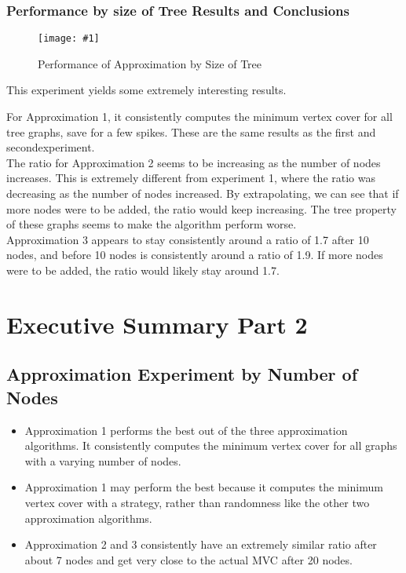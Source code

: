 \documentclass[12pt]{article}
\newcommand{\firgureBuffered}[2]
{
    \begin{figure}[ht!]
        \centering
        \texttt{[image: \#1]}
        \caption{#2}
    \end{figure}
}
\begin{document}
\subsubsection{Performance by size of Tree Results and Conclusions}

\FloatBarrier{}
\firgureBuffered{images/approxexperiments/Tree1.png}{Performance of Approximation by Size of Tree}
\FloatBarrier{}

This experiment yields some extremely interesting results.

For Approximation 1, it consistently computes the minimum vertex cover for all tree graphs, save for a few spikes. These are the same results as the first and secondexperiment. \\

The ratio for Approximation 2 seems to be increasing as the number of nodes increases. This is extremely different from experiment 1, where the ratio was decreasing as the number of nodes increased. By extrapolating, we can see that if more nodes were to be added, the ratio would keep increasing. The tree property of these graphs seems to make the algorithm perform worse.\\

Approximation 3 appears to stay consistently around a ratio of 1.7 after 10 nodes, and before 10 nodes is consistently around a ratio of 1.9. If more nodes were to be added, the ratio would likely stay around 1.7. \\



%
%
%
%

\newpage

\section{Executive Summary Part 2}

\subsection{Approximation Experiment by Number of Nodes}

\begin{itemize}
    \item Approximation 1 performs the best out of the three approximation algorithms. It consistently computes the minimum vertex cover for all graphs with a varying number of nodes.
    \item Approximation 1 may perform the best because it computes the minimum vertex cover with a strategy, rather than randomness like the other two approximation algorithms.
    \item Approximation 2 and 3 consistently have an extremely similar ratio after about 7 nodes and get very close to the actual MVC after 20 nodes.
\end{itemize}
\end{document}
